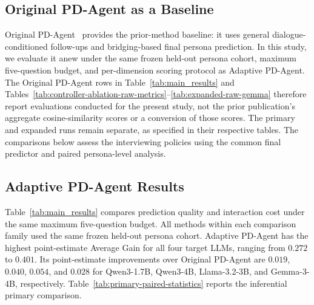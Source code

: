 \documentclass{ieeeaccess}
\begin{document}
\subsection{Original PD-Agent as a Baseline}

Original PD-Agent~\cite{yang2026pragmatic} provides the prior-method baseline: it uses
general dialogue-conditioned follow-ups and bridging-based final persona prediction.
In this study, we evaluate it anew under the same frozen held-out persona cohort,
maximum five-question budget, and per-dimension scoring protocol as Adaptive PD-Agent.
The Original PD-Agent rows in Table~\ref{tab:main_results} and
Tables~\ref{tab:controller-ablation-raw-metrics}--\ref{tab:expanded-raw-gemma}
therefore report evaluations conducted for the present study, not the prior publication's
aggregate cosine-similarity scores or a conversion of those scores. The primary and
expanded runs remain separate, as specified in their respective tables. The comparisons
below assess the interviewing policies using the common final predictor and paired
persona-level analysis.

\subsection{Adaptive PD-Agent Results}



Table~\ref{tab:main_results} compares prediction quality and interaction cost under the
same maximum five-question budget. All methods within each comparison family used the
same frozen held-out persona cohort. Adaptive PD-Agent has the highest point-estimate
Average Gain for all four target LLMs, ranging from $0.272$ to $0.401$. Its point-estimate
improvements over Original PD-Agent are $0.019$, $0.040$, $0.054$, and $0.028$ for
Qwen3-1.7B, Qwen3-4B, Llama-3.2-3B, and Gemma-3-4B, respectively.
Table~\ref{tab:primary-paired-statistics} reports the inferential primary comparison.
\end{document}
